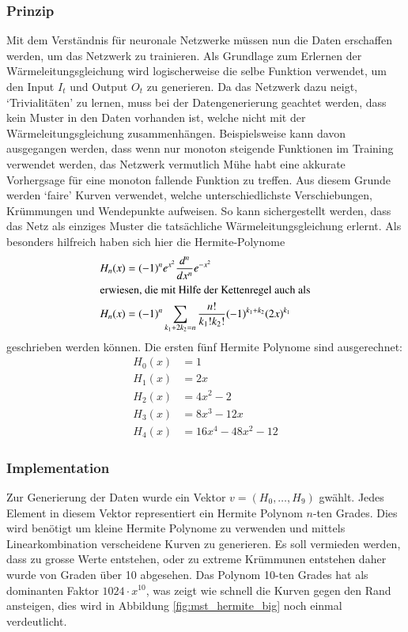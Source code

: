 \subsubsection{Prinzip}
Mit dem Verständnis für neuronale Netzwerke müssen nun die Daten erschaffen werden, um das Netzwerk zu trainieren. Als Grundlage zum Erlernen der Wärmeleitungsgleichung wird logischerweise die selbe Funktion verwendet, um den Input $I_{t}$ und Output $O_{t}$ zu generieren. Da das Netzwerk dazu neigt, `Trivialitäten' zu lernen, muss bei der Datengenerierung geachtet werden, dass kein Muster in den Daten vorhanden ist, welche nicht mit der Wärmeleitungsgleichung zusammenhängen. Beispielsweise kann davon ausgegangen werden, dass wenn nur monoton steigende Funktionen im Training verwendet werden, das Netzwerk vermutlich Mühe habt eine akkurate Vorhergsage für eine monoton fallende Funktion zu treffen. Aus diesem Grunde werden `faire' Kurven verwendet, welche unterschiedlichste Verschiebungen, Krümmungen und Wendepunkte aufweisen. So kann sichergestellt werden, dass das Netz als einziges Muster die tatsächliche Wärmeleitungsgleichung erlernt. Als besonders hilfreich haben sich hier die Hermite-Polynome
\begin{align}
	H_n(x) &=(-1)^{n}e^{x^{2}}{\frac {d^{n}}{d x^{n}}}e^{-x^{2}}
	\\
	\intertext{erwiesen, die mit Hilfe der Kettenregel auch als}
	H_n(x) &=(-1)^{n}\sum _{k_{1}+2k_{2}=n}{\frac {n!}{k_{1}!k_{2}!}}(-1)^{k_{1}+k_{2}}(2x)^{k_{1}}
\end{align}
geschrieben werden können.
Die ersten fünf Hermite Polynome sind ausgerechnet:
\begin{align}
H_{0}(x) &= 1\\
H_{1}(x) &= 2x\\
H_{2}(x) &= 4x^{2}-2\\
H_{3}(x) &= 8x^{3}-12x\\
H_{4}(x) &= 16x^{4}-48x^{2}-12
\end{align}

\subsubsection{Implementation}

Zur Generierung der Daten wurde ein Vektor $v=(H_0, \dots ,H_9)$ gwählt. Jedes Element in diesem Vektor representiert ein Hermite Polynom $n$-ten Grades. Dies wird benötigt um kleine Hermite Polynome zu verwenden und mittels Linearkombination verscheidene Kurven zu generieren. Es soll vermieden werden, dass zu grosse Werte entstehen, oder zu extreme Krümmunen entstehen daher wurde von Graden über 10 abgesehen. Das Polynom 10-ten Grades hat als dominanten Faktor $1024 \cdot x^{10}$, was zeigt wie schnell die Kurven gegen den Rand ansteigen, dies wird in Abbildung \ref{fig:mst_hermite_big} noch einmal verdeutlicht.

